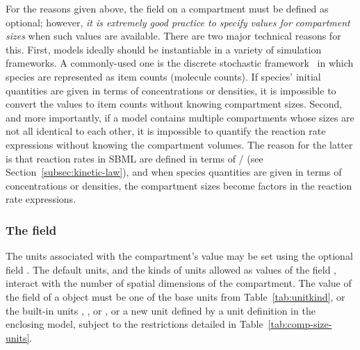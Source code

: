For the reasons given above, the  field on a
compartment must be defined as optional; however, \emph{it is
  extremely good practice to specify values for compartment sizes}
when such values are available.  There are two major technical
reasons for this.  First, models ideally should be instantiable in
a variety of simulation frameworks.  A commonly-used one is the
discrete stochastic
framework~\citep{gillespie:1977,wilkinson_2006} in which species
are represented as item counts (\eg molecule counts).  If species'
initial quantities are given in terms of concentrations or
densities, it is impossible to convert the values to item counts
without knowing compartment sizes.  Second, and more importantly,
if a model contains multiple compartments whose sizes are not all
identical to each other, it is impossible to quantify the reaction
rate expressions without knowing the compartment volumes.  The
reason for the latter is that reaction rates in SBML are defined
in terms of / (see
Section~\ref{subsec:kinetic-law}), and when species quantities are
given in terms of concentrations or densities, the compartment
sizes become factors in the reaction rate expressions.


\subsubsection{The  field}
\label{sec:compartment-units}

The units associated with the compartment's  value may
be set using the optional field .  The default units,
and the kinds of units allowed as values of the field
, interact with the number of spatial dimensions of
the compartment.  The value of the  field of a
\Compartment object must be one of the base units from
Table~\vref{tab:unitkind}, or the built-in units ,
,  or , or a new unit
defined by a unit definition in the enclosing model, subject to
the restrictions detailed in Table~\ref{tab:comp-size-units}.

